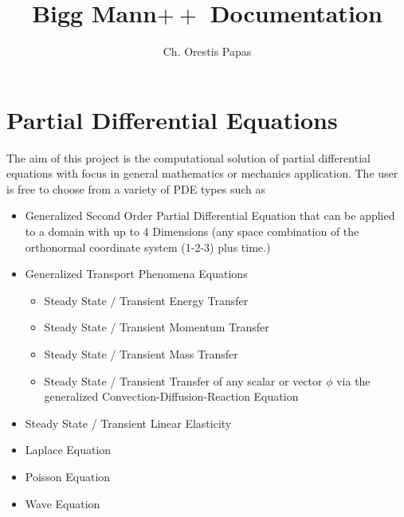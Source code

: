 \documentclass{article}
\title{Bigg Mann$++$ Documentation}
\author{Ch. Orestis Papas}
\begin{document}
	\section{Partial Differential Equations}
		The aim of this project is the computational solution of partial differential equations with focus in general mathematics or mechanics application. The user is free to choose from a variety of PDE types such as 
		\begin{itemize}
			\item Generalized Second Order Partial Differential Equation that can be applied to a domain with up to 4 Dimensions (any space combination of the orthonormal coordinate system (1-2-3) plus time.)
			\item Generalized Transport Phenomena Equations
			\begin{itemize}
				\item Steady State / Transient Energy Transfer
				\item Steady State / Transient Momentum Transfer
				\item Steady State / Transient Mass Transfer
				\item Steady State / Transient Transfer of any scalar or vector $\phi$ via the generalized Convection-Diffusion-Reaction Equation	
			\end{itemize}
		 	\item Steady State / Transient Linear Elasticity
		 	\item Laplace Equation
		 	\item Poisson Equation
		 	\item Wave Equation		 	 
		\end{itemize}
	
	
\end{document}
